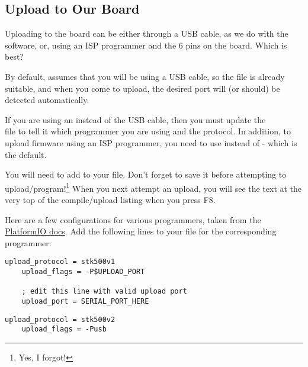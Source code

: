 \subsection{Upload to Our Board}\label{upload-to-our-board}

Uploading to the board can be either through a USB cable, as we do with the   software, or, using an ISP programmer and the 6 pins on the   board. Which is best?

By default,  assumes that you will be using a USB cable, so the file  is already suitable, and when you come to upload, the desired port will (or should) be detected automatically.

If you are using an  instead of the USB cable, then you must update the\\  file to tell it which programmer you are using and the protocol. In addition, to upload firmware using an ISP programmer, you need to use  instead of  - which is the default. 

You will need to add  to your  file. Don't forget to save it before attempting to upload/program!\footnote{Yes, I forgot!} When you next attempt an upload, you will see the text  at the very top of the compile/upload listing when you press F8.


Here are a few configurations for various programmers, taken from the \href{http://docs.platformio.org/en/latest/platforms/atmelavr.html?highlight=usbtiny#upload-using-programmer}{PlatformIO docs}. Add the following lines to your  file for the corresponding programmer:

\begin{lstlisting}[caption={The \inline{platformio.ini} additions for `AVRISP' ISP Programmer}]
    upload_protocol = stk500v1
    upload_flags = -P$UPLOAD_PORT

    ; edit this line with valid upload port
    upload_port = SERIAL_PORT_HERE
\end{lstlisting}


\begin{lstlisting}[caption={The \inline{platformio.ini} additions for `AVRISP MkII' Programmer}]
    upload_protocol = stk500v2
    upload_flags = -Pusb
\end{lstlisting}


